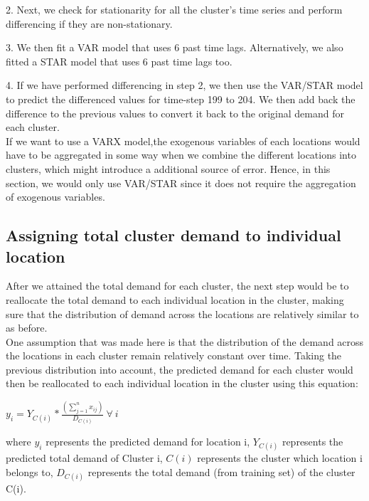 \documentclass[nonblindrev,msom]{informs3} %
\begin{document}
2. Next, we check for stationarity for all the cluster's time series and perform differencing if they are non-stationary. 

3. We then fit a VAR model that uses 6 past time lags. Alternatively, we also fitted a STAR model that uses 6 past time lags too. 

4. If we have performed differencing in step 2, we then use the VAR/STAR model to predict the differenced values for time-step 199 to 204. We then add back the difference to the previous values to convert it back to the original demand for each cluster. \\

\noindent If we want to use a VARX model,the exogenous variables of each locations would have to be aggregated in some way when we combine the different locations into clusters, which might introduce a additional source of error. Hence, in this section, we would only use VAR/STAR since it does not require the aggregation of exogenous variables.


\subsection{Assigning total cluster demand to individual location}

After we attained the total demand for each cluster, the next step would be to reallocate the total demand to each individual location in the cluster, making sure that the distribution of demand across the locations are relatively similar to as before. \\

\noindent One assumption that was made here is that the distribution of the demand across the locations in each cluster remain relatively constant over time. Taking the previous distribution into account, the predicted demand for each cluster would then be reallocated to each individual location in the cluster using this equation:

\begin{center}
    $\displaystyle y_{i} = Y_{C(i)} * \frac{(\sum_{j=1}^{n}x_{ij})}{D_{C(i)}} \: \forall \: i$
\end{center}

\noindent where $y_i$ represents the predicted demand for location i, $Y_{C(i)}$ represents the predicted total demand of Cluster i, $C(i)$ represents the cluster which location i belongs to, $D_{C(i)}$ represents the total demand (from training set) of the cluster C(i).
\end{document}
